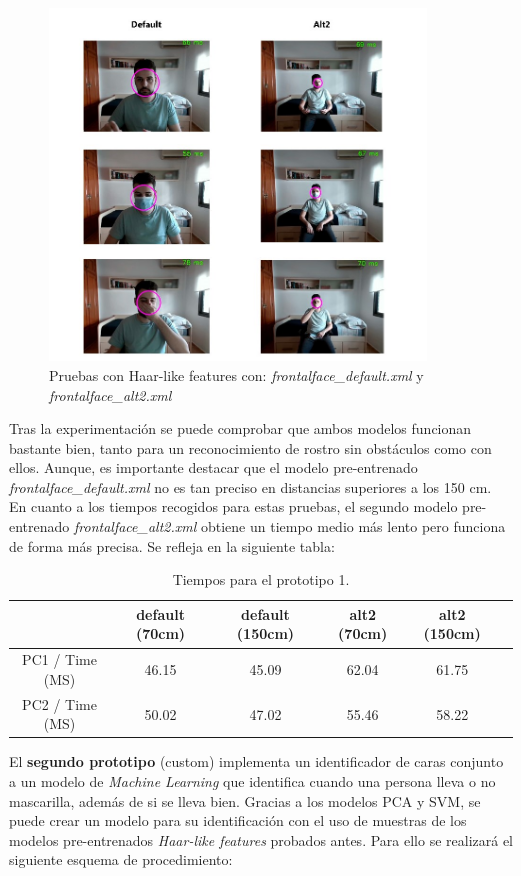 \begin{figure}[htp]
	\centering
	\includegraphics[width=10cm]{imagenes/prueba_proto1.jpg}
	\caption{Pruebas con Haar-like features con: \textit{frontalface\_default.xml} y \textit{frontalface\_alt2.xml}}
	\label{fig:haar1}
\end{figure}

Tras la experimentación se puede comprobar que ambos modelos funcionan bastante bien, tanto para un reconocimiento de rostro sin obstáculos como con ellos. Aunque, es importante destacar que el modelo pre-entrenado \textit{frontalface\_default.xml} no es tan preciso en distancias superiores a los 150 cm. En cuanto a los tiempos recogidos para estas pruebas, el segundo modelo pre-entrenado \textit{frontalface\_alt2.xml} obtiene un tiempo medio más lento pero funciona de forma más precisa. Se refleja en la siguiente tabla:

\begin{table}[h!]
	\begin{center}
		\begin{tabular}{ |c|c|c|c|c|c| } 
			\hline
			& default (70cm) & default (150cm) & alt2 (70cm) & alt2 (150cm) \\
			\hline
			PC1 / Time (MS) & 46.15  & 45.09 & 62.04  & 61.75 \\
			\hline
			PC2 / Time (MS) & 50.02  & 47.02 & 55.46  & 58.22 \\
			\hline
		\end{tabular}
		\caption{Tiempos para el prototipo 1.}
		\label{tab:table2}
	\end{center}
\end{table}

El \textbf{segundo prototipo} (custom) implementa un identificador de caras conjunto a un modelo de \textit{Machine Learning} que identifica cuando una persona lleva o no mascarilla, además de si se lleva bien. Gracias a los modelos PCA y SVM, se puede crear un modelo para su identificación con el uso de muestras de los modelos pre-entrenados \textit{Haar-like features} probados antes. Para ello se realizará el siguiente esquema de procedimiento:

